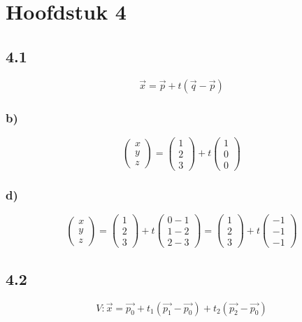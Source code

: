 \documentclass[11pt]{article}
\begin{document}
\section*{Hoofdstuk 4}
\subsection*{4.1}
\[
\vec{x}=\vec{p}+t(\vec{q}-\vec{p})
\]
\subsubsection*{b)}
\[
\begin{pmatrix}
x\\y\\z
\end{pmatrix}
=
\begin{pmatrix}
1\\2\\3
\end{pmatrix}
+t
\begin{pmatrix}
1\\0\\0
\end{pmatrix}
\]
\subsubsection*{d)}
\[
\begin{pmatrix}
x\\y\\z
\end{pmatrix}
=
\begin{pmatrix}
1\\2\\3
\end{pmatrix}
+t
\begin{pmatrix}
0-1\\1-2\\2-3
\end{pmatrix}
=
\begin{pmatrix}
1\\2\\3
\end{pmatrix}
+t
\begin{pmatrix}
-1\\-1\\-1
\end{pmatrix}
\]

\subsection*{4.2}
\[
V: \vec{x} = \vec{p_0}+t_1(\vec{p_1}-\vec{p_0}) +t_2(\vec{p_2}-\vec{p_0})
\]
\end{document}
